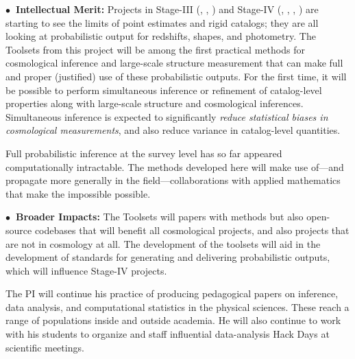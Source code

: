 \documentclass[12pt]{article}
\begin{document}
\noindent
\textbf{$\bullet$~Intellectual Merit:}
Projects in Stage-III (\eg, \boss, \des)
and Stage-IV (\eg, \lsst, \euclid, \wfirst)
are starting to see the limits of point estimates and rigid catalogs;
they are all looking at probabilistic output for redshifts,
shapes, and photometry.
The Toolsets from this project will be among the first practical methods for
cosmological inference and large-scale structure measurement that can
make full and proper (justified) use of these probabilistic outputs.
For the first time, it will be possible to perform
simultaneous inference or refinement of catalog-level properties along with
large-scale structure and cosmological inferences.
Simultaneous inference is expected to significantly \emph{reduce statistical
biases in cosmological measurements},
and also reduce variance in catalog-level quantities.

Full probabilistic inference at the survey level has so far appeared
computationally intractable.
The methods developed here will make use of---and propagate more
generally in the field---collaborations with applied mathematics that
make the impossible possible.

\noindent
\textbf{$\bullet$~Broader Impacts:}
The Toolsets will papers with methods but also open-source codebases
that will benefit all cosmological projects, and also projects that
are not in cosmology at all.
The development of the toolsets will aid in the development of
standards for generating and delivering probabilistic outputs, which
will influence Stage-IV projects.

The PI will continue his practice of producing pedagogical papers on
inference, data analysis, and computational statistics in the physical
sciences.
These reach a range of populations inside and outside academia.
He will also continue to work with his students to organize and staff
influential data-analysis Hack Days at scientific meetings.
\end{document}
